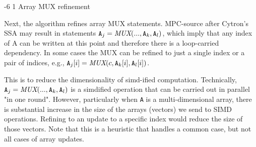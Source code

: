 \documentclass[sigconf, screen, natbib=false, dvipsnames, table]{acmart}
\makeatletter
\renewcommand{\subsubsection}{\@startsection{subsubsection}{3}{\z@}%
                        {-6\p@ \@plus -4\p@ \@minus -4\p@}%
                        {1\p@ \@plus 1\p@ \@minus 0\p@}%
                        {\normalfont\normalsize\bfseries\boldmath}}
\theoremstyle{definition}
\makeatother
\begin{document}

\subsubsection{Array MUX refinement}


Next, the algorithm refines array MUX statements.
MPC-source after Cytron's SSA may result in statements $\texttt{A}_j = \emph{MUX}(..., \texttt{A}_k, \texttt{A}_l)$, which imply that any index
of A can be written at this point and therefore there is a loop-carried dependency. In some cases the MUX can be refined to just a single
index or a pair of indices, e.g., $\texttt{A}_j[i] = \emph{MUX}(c, \texttt{A}_k[i], \texttt{A}_l[i])$.

This is to reduce the dimensionality of simd-ified computation. Technically, $\texttt{A}_j = \emph{MUX}(..., \texttt{A}_k, \texttt{A}_l)$ is
a simdified operation that can be carried out in parallel "in one round". However, particularly when \texttt{A} is a multi-dimensional array, there is
substantial increase in the size of the arrays (vectors) we send to SIMD operations. Refining to an update to a specific index would reduce
the size of those vectors. Note that this is a heuristic that handles a common case, but not all cases of array updates.
\end{document}
